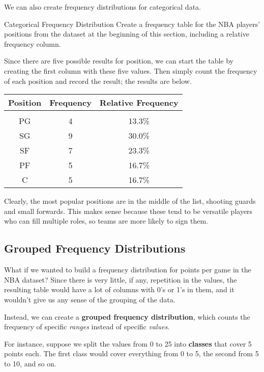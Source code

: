 We can also create frequency distributions for categorical data.

\begin{example}[https://www.youtube.com/watch?v=kd5trlD4WXw&list=PLfmpjsIzhzttL_Uec2nCbDRcAcUF7NKG8&index=8]{Categorical Frequency Distribution}
Create a frequency table for the NBA players' positions from the dataset at the beginning of this section, including a relative frequency column.

\sol
Since there are five possible results for position, we can start the table by creating the first column with these five values.  Then simply count the frequency of each position and record the result; the results are below.
\begin{center}
\begin{tabular}{c c c}
\textbf{Position} & \textbf{Frequency} & \textbf{Relative Frequency}\\
\hline
& & \\
PG & 4 & 13.3\%\\
SG & 9 & 30.0\%\\
SF & 7 & 23.3\%\\
PF & 5 & 16.7\%\\
C & 5 & 16.7\%
\end{tabular}
\end{center}

Clearly, the most popular positions are in the middle of the list, shooting guards and small forwards.  This makes sense because these tend to be versatile players who can fill multiple roles, so teams are more likely to sign them.
\end{example}
\vfill

\subsection{Grouped Frequency Distributions}
What if we wanted to build a frequency distribution for points per game in the NBA dataset?  Since there is very little, if any, repetition in the values, the resulting table would have a lot of columns with 0's or 1's in them, and it wouldn't give us any sense of the grouping of the data.

Instead, we can create a \textbf{grouped frequency distribution}, which counts the frequency of specific \emph{ranges} instead of specific \emph{values}.

For instance, suppose we split the values from 0 to 25 into \textbf{classes} that cover 5 points each.  The first class would cover everything from 0 to 5, the second from 5 to 10, and so on.
\vfill

